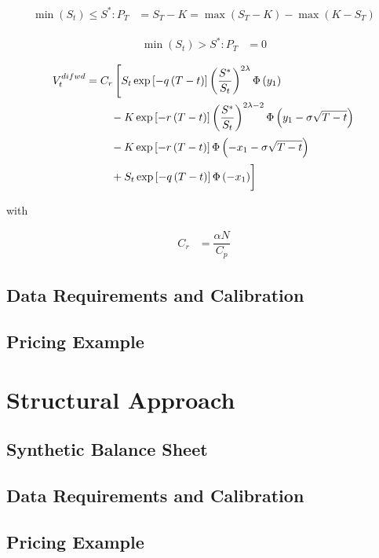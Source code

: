 \begin{align}
\min\left( S_t\right) \leq S^* : P_T &= S_T -K = \max \left( S_T - K \right) -\max\left( K-S_T \right)
\end{align}

\begin{align}
\min\left( S_t \right) > S^* : P_T &= 0
\end{align}

\begin{align}
    V_t^{difwd} &= C_r \left[ S_t \exp\left[- q \left(T-t\right)\right]\left(\dfrac{S^*}{S_t}\right)^{2 \lambda} \Phi\left(y_1\right) \right.\nonumber\\
   &\qquad \left.\vphantom{\dfrac{S^*}{S_t}} - K \exp\left[- r \left(T-t\right)\right] \left(\dfrac{S^*}{S_t}\right)^{2 \lambda - 2} \Phi\left(y_1 - \sigma \sqrt{T-t}\right) \right.\nonumber\\
   &\qquad \left.\vphantom{\dfrac{S^*}{S_t}} - K \exp\left[- r \left(T-t\right)\right] \Phi\left(-x_1 - \sigma \sqrt{T-t}\right) \right.\nonumber\\
   &\qquad \left.\vphantom{\dfrac{S^*}{S_t}} + S_t \exp\left[- q \left(T-t\right)\right] \Phi\left(- x_1\right) \right] 
\end{align}

with 

\begin{align}
C_r &= \dfrac{\alpha N}{C_p}
\end{align}

\subsection{Data Requirements and Calibration}

\subsection{Pricing Example}

\section{Structural Approach}

\subsection{Synthetic Balance Sheet}

\subsection{Data Requirements and Calibration}

\subsection{Pricing Example}



